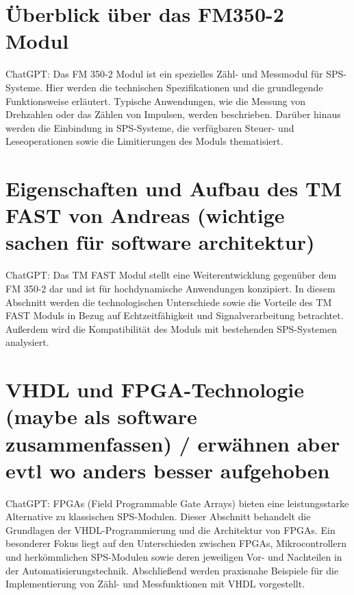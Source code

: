 \section{Überblick über das FM350-2 Modul}  
ChatGPT:
Das FM 350-2 Modul ist ein spezielles Zähl- und Messmodul für SPS-Systeme. Hier werden die technischen Spezifikationen und die grundlegende Funktionsweise erläutert.  
Typische Anwendungen, wie die Messung von Drehzahlen oder das Zählen von Impulsen, werden beschrieben.  
Darüber hinaus werden die Einbindung in SPS-Systeme, die verfügbaren Steuer- und Leseoperationen sowie die Limitierungen des Moduls thematisiert.  
\section{Eigenschaften und Aufbau des TM FAST von Andreas (wichtige sachen für software architektur)}  
ChatGPT:
Das TM FAST Modul stellt eine Weiterentwicklung gegenüber dem FM 350-2 dar und ist für hochdynamische Anwendungen konzipiert.  
In diesem Abschnitt werden die technologischen Unterschiede sowie die Vorteile des TM FAST Moduls in Bezug auf Echtzeitfähigkeit und Signalverarbeitung betrachtet.  
Außerdem wird die Kompatibilität des Moduls mit bestehenden SPS-Systemen analysiert.  
\section{VHDL und FPGA-Technologie (maybe als software zusammenfassen) / erwähnen aber evtl wo anders besser aufgehoben}  
ChatGPT:
FPGAs (Field Programmable Gate Arrays) bieten eine leistungsstarke Alternative zu klassischen SPS-Modulen.  
Dieser Abschnitt behandelt die Grundlagen der VHDL-Programmierung und die Architektur von FPGAs.  
Ein besonderer Fokus liegt auf den Unterschieden zwischen FPGAs, Mikrocontrollern und herkömmlichen SPS-Modulen sowie deren jeweiligen Vor- und Nachteilen in der Automatisierungstechnik.  
Abschließend werden praxisnahe Beispiele für die Implementierung von Zähl- und Messfunktionen mit VHDL vorgestellt.  

